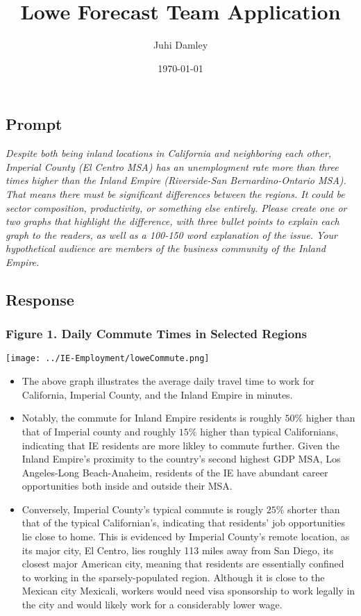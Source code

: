 \documentclass[12pt]{article}
\title{Lowe Forecast Team Application}
\author{Juhi Damley}
\date{\today}
\begin{document}
\maketitle
\subsection*{Prompt}
\emph{Despite both being inland locations in California and neighboring each other, Imperial County (El Centro MSA) has an unemployment rate more than three times higher than the Inland Empire (Riverside-San Bernardino-Ontario MSA). That means there must be significant differences between the regions. It could be sector composition, productivity, or something else entirely. Please create one or two graphs that highlight the difference, with three bullet points to explain each graph to the readers, as well as a 100-150 word explanation of the issue. Your hypothetical audience are members of the business community of the Inland Empire.}

\subsection*{Response}
\subsubsection*{Figure 1. Daily Commute Times in Selected Regions}
\texttt{[image: ../IE-Employment/loweCommute.png]}

\begin{itemize}
	\item The above graph illustrates the average daily travel time to work for California, Imperial County, and the Inland Empire in minutes.
	\item Notably, the commute for Inland Empire residents is roughly $50\%$ higher than that of Imperial county and roughly $15\%$ higher than typical Californians, indicating that IE residents are more likley to commute further. Given the Inland Empire's proximity to the country's second highest GDP MSA, Los Angeles-Long Beach-Anaheim, residents of the IE have abundant career opportunities both inside and outside their MSA. 
	\item Conversely, Imperial County's typical commute is rougly $25\%$ shorter than that of the typical Californian's, indicating that residents' job opportunities lie close to home. This is evidenced by Imperial County's remote location, as its major city, El Centro, lies roughly 113 miles away from San Diego, its closest major American city, meaning that residents are essentially confined to working in the sparsely-populated region. Although it is close to the Mexican city Mexicali, workers would need visa sponsorship to work legally in the city and would likely work for a considerably lower wage. 
\end{itemize}
\end{document}
